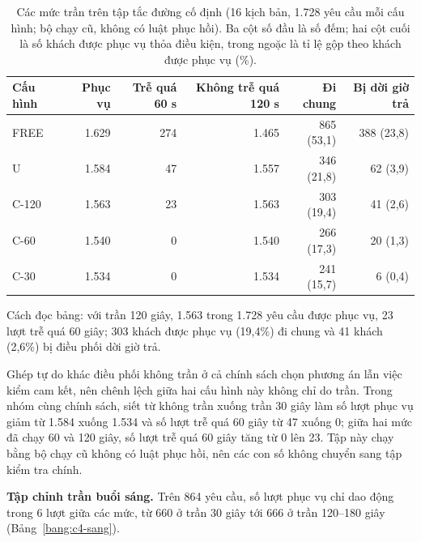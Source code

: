 \begin{table}[htbp]
\centering
\caption{Các mức trần trên tập tắc đường cố định (16 kịch bản, 1.728 yêu cầu mỗi cấu hình; bộ chạy cũ,
không có luật phục hồi). Ba cột số đầu là số đếm; hai cột cuối là số khách được phục vụ thỏa điều kiện, trong ngoặc
là tỉ lệ gộp theo khách được phục vụ (\%).}
\label{bang:c4-codinh}
\small
\begin{tabular}{@{}lrrrrr@{}}
\toprule
\textbf{Cấu hình} & \textbf{Phục vụ} & \textbf{Trễ quá 60 s} & \textbf{Không trễ quá 120 s} &
\textbf{Đi chung} & \textbf{Bị dời giờ trả}\\
\midrule
FREE & 1.629 & 274 & 1.465 & 865 (53,1) & 388 (23,8)\\
U & 1.584 & 47 & 1.557 & 346 (21,8) & 62 (3,9)\\
C-120 & 1.563 & 23 & 1.563 & 303 (19,4) & 41 (2,6)\\
C-60 & 1.540 & 0 & 1.540 & 266 (17,3) & 20 (1,3)\\
C-30 & 1.534 & 0 & 1.534 & 241 (15,7) & 6 (0,4)\\
\bottomrule
\end{tabular}
\end{table}

Cách đọc bảng: với trần 120 giây, 1.563 trong 1.728 yêu cầu được phục vụ, 23 lượt trễ quá 60 giây; 303 khách được
phục vụ (19,4\%) đi chung và 41 khách (2,6\%) bị điều phối dời giờ trả.

Ghép tự do khác điều phối không trần ở cả chính sách chọn phương án lẫn việc kiểm cam kết, nên chênh lệch giữa hai
cấu hình này không chỉ do trần. Trong nhóm cùng chính sách, siết từ không trần xuống trần 30 giây làm số lượt phục vụ
giảm từ 1.584 xuống 1.534 và số lượt trễ quá 60 giây từ 47 xuống 0; giữa hai mức đã chạy 60 và 120 giây, số lượt trễ
quá 60 giây tăng từ 0 lên 23. Tập này chạy bằng bộ chạy cũ không có luật phục hồi, nên các con số không chuyển sang
tập kiểm tra chính.

\textbf{Tập chỉnh trần buổi sáng.} Trên 864 yêu cầu, số lượt phục vụ chỉ dao động trong 6 lượt giữa các mức, từ 660
ở trần 30 giây tới 666 ở trần 120--180 giây (Bảng~\ref{bang:c4-sang}).

